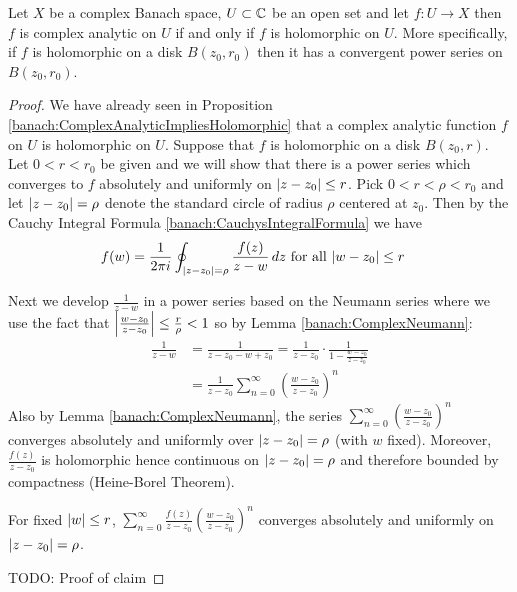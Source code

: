 \begin{thm}\label{banach:ComplexAnalyticHolomorphicEquivalence}Let $X$ be a complex Banach space, $U \subset \mathbb{C}$ be an open set and let $f : U \to X$ then $f$ is complex analytic on $U$ if and only if $f$ is holomorphic on $U$.  More specifically, if $f$ is holomorphic on a disk $B(z_0, r_0)$ then it has a convergent power series on $B(z_0, r_0)$.
\end{thm}
\begin{proof}
  We have already seen in Proposition \ref{banach:ComplexAnalyticImpliesHolomorphic} that a complex analytic function $f$ on $U$ is holomorphic on $U$.  Suppose that $f$ is holomorphic on a disk $B(z_0, r)$.   Let $0 < r < r_0$ be given and we will show that there is a power series which converges to $f$ absolutely and uniformly on $\left \vert z - z_0 \right \vert \leq r$.   Pick $0 < r < \rho < r_0$ and let $\left \vert z - z_0 \right \vert = \rho$ denote the standard circle of radius $\rho$ centered at $z_0$.   Then by the Cauchy Integral Formula \ref{banach:CauchysIntegralFormula} we have
  \begin{align*}
   f(w) &= \frac{1}{2\pi i}  \oint_{\left \vert z - z_0 \right \vert = \rho} \frac{f(z)}{z - w} \, dz \text{ for all $\left \vert w - z_0 \right \vert \leq r$}
  \end{align*}

  Next we develop $\frac{1}{z - w}$ in a power series based on the Neumann series where we use the fact that $\left \vert \frac{w - z_0}{z - z_0} \right \vert \leq \frac{r}{\rho} < 1$ so by Lemma \ref{banach:ComplexNeumann}:
  \begin{align*}
    \frac{1}{z - w} &=   \frac{1}{z - z_0 - w + z_0}  = \frac{1}{z - z_0} \cdot \frac{1}{1 - \frac{w - z_0}{z - z_0}} \\
    &=\frac{1}{z - z_0} \sum_{n=0}^\infty \left(\frac{w - z_0}{z - z_0}\right)^n
  \end{align*}
  Also by Lemma \ref{banach:ComplexNeumann}, the series $\sum_{n=0}^\infty \left(\frac{w - z_0}{z - z_0}\right)^n$ converges absolutely and uniformly over $\left \vert z - z_0 \right \vert = \rho$ (with $w$ fixed).   Moreover, $\frac{f(z)}{z - z_0}$ is holomorphic hence continuous on $\left \vert z - z_0 \right \vert = \rho$ and therefore bounded by compactness (Heine-Borel Theorem).

  \begin{clm}For fixed $\left \vert w \right \vert \leq r$, $\sum_{n=0}^\infty \frac{f(z)}{z - z_0}\left(\frac{w - z_0}{z - z_0}\right)^n$ converges absolutely and uniformly on $\left \vert z - z_0 \right \vert = \rho$.
  \end{clm}
  TODO: Proof of claim



\end{proof}
